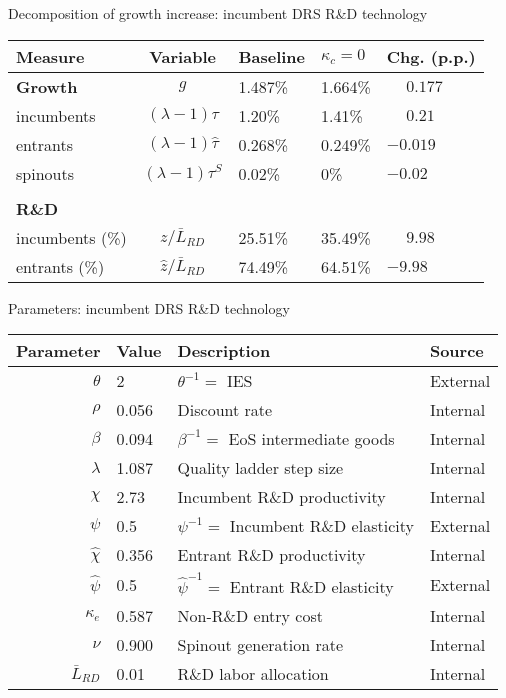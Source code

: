 \documentclass[english,usenames,dvipsnames]{beamer}
\begin{document}
\begin{frame}{Decomposition of growth increase: incumbent DRS R\&D technology}\label{decomposition_growth_increase:incumbentDRS}
	\hyperlink{reducing_kappa_c_table:incumbentDRS}{}
	\begin{table}
		\centering
		\footnotesize
		\begin{tabular}{lclll}
			\toprule \toprule
			Measure & Variable & Baseline & $\kappa_c = 0$ & Chg. (p.p.) \tabularnewline
			\midrule
			\textbf{Growth} & $g$ & 1.487\% & 1.664\% & $\phantom{-}0.177$\tabularnewline
			\multicolumn{1}{l}{\quad incumbents} & $(\lambda -1) \tau$  & 1.20\% & 1.41\% & $\phantom{-}0.21$ \tabularnewline
			\multicolumn{1}{l}{\quad entrants} & $(\lambda -1) \hat{\tau}$ & 0.268\% & 0.249\% & $-0.019$ \tabularnewline
			\multicolumn{1}{l}{\quad spinouts} & $(\lambda -1) \tau^S$ & 0.02\% & 0\% & $-0.02$\tabularnewline
			\tabularnewline
			\textbf{R\&D} & & & & 
			\tabularnewline
			\multicolumn{1}{l}{\quad incumbents (\%)}  & $z / \bar{L}_{RD}$ & 25.51\% & 35.49\% & $\phantom{-}9.98$ \tabularnewline 		
			\multicolumn{1}{l}{\quad entrants (\%)}  & $\hat{z} / \bar{L}_{RD}$ & 74.49\% & 64.51\% & $-9.98$ \tabularnewline
			\bottomrule
		\end{tabular}
	\end{table}
\end{frame}

\begin{frame}{Parameters: incumbent DRS R\&D technology}\label{parameters:incumbentDRS}
	\hyperlink{reducing_kappa_c_table:incumbentDRS}{}
	\begin{table}[]
		\footnotesize
		\centering
		\begin{tabular}{rlll}
			\toprule \toprule
			Parameter & Value & Description & Source \tabularnewline
			\midrule
			$\theta$ & 2 & $\theta^{-1} = $ IES & External
			\tabularnewline
			$\rho$ & 0.056 & Discount rate  & Internal \tabularnewline
			$\beta$ & 0.094 & $\beta^{-1} = $ EoS intermediate goods & Internal \tabularnewline 
			$\lambda$ & 1.087 & Quality ladder step size & Internal
			\tabularnewline
			$\chi$ & 2.73 & Incumbent R\&D productivity & Internal
			\tabularnewline
			$\psi$ & 0.5 & $\psi^{-1} = $ Incumbent R\&D elasticity & External \tabularnewline
			$\hat{\chi}$ & 0.356 & Entrant R\&D productivity & Internal \tabularnewline 
			$\hat{\psi}$ & 0.5 & $\hat{\psi}^{-1} = $ Entrant R\&D elasticity & External \tabularnewline
			$\kappa_e$ & 0.587 & Non-R\&D entry cost & Internal \tabularnewline
			$\nu$ & 0.900 & Spinout generation rate  & Internal \tabularnewline
			$\bar{L}_{RD}$ & 0.01 & R\&D labor allocation  & Internal \tabularnewline
			\bottomrule
		\end{tabular}
	\end{table}
\end{frame}
\end{document}
